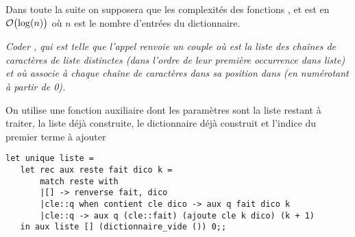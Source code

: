 \medskip

Dans toute la suite on supposera que les complexités des fonctions ,  et  est en ${\cal O}\bigl(\log(n)\bigr)$ où $n$ est le nombre d'entrées du dictionnaire. 
\begin{Exercise}\it
Coder , qui est telle que l'appel  renvoie un couple  où  est la liste des chaînes de caractères de liste distinctes (dans l'ordre de leur première occurrence dans liste) et où  associe à chaque chaîne de caractères dans  sa position dans  (en numérotant à partir de 0). \end{Exercise}
\begin{Answer} On utilise une fonction auxiliaire dont les paramètres sont la liste restant à traiter, la liste déjà construite, le dictionnaire déjà construit et l'indice du premier terme à ajouter
\begin{lstlisting}
let unique liste = 
   let rec aux reste fait dico k =
       match reste with
       |[] -> renverse fait, dico
       |cle::q when contient cle dico -> aux q fait dico k
       |cle::q -> aux q (cle::fait) (ajoute cle k dico) (k + 1) 
   in aux liste [] (dictionnaire_vide ()) 0;;
       
\end{lstlisting}
\end{Answer}

